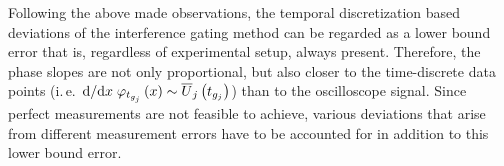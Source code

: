 Following the above made observations, the temporal discretization based deviations of the interference gating method can be regarded as a lower bound error that is, regardless of experimental setup, always present. Therefore, the phase slopes are not only proportional, but also closer to the time-discrete data points (i.\,e. $\dv*{}{x} {\varphi}_{t_{g_j}}\left(x\right) \sim \overline{U}_j\left(t_{g_j}\right)$) than to the oscilloscope signal. Since perfect measurements are not feasible to achieve, various deviations that arise from different measurement errors have to be accounted for in addition to this lower bound error.